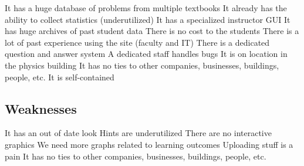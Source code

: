 It has a huge database of problems from multiple textbooks
It already has the ability to collect statistics (underutilized)
It has a specialized instructor GUI
It has huge archives of past student data
There is no cost to the students
There is a lot of past experience using the site (faculty and IT)
There is a dedicated question and answer system
A dedicated staff handles bugs
It is on location in the physics building
It has no ties to other companies, businesses, buildings, people, etc.
It is self-contained

\subsection{Weaknesses}

It has an out of date look
Hints are underutilized
There are no interactive graphics
We need more graphs related to learning outcomes
Uploading stuff is a pain
It has no ties to other companies, businesses, buildings, people, etc.